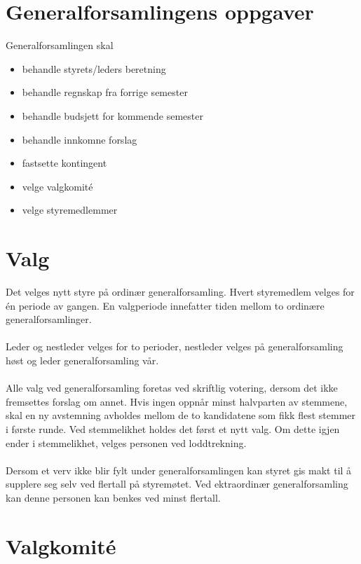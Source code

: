 \documentclass[12pt,a4paper,norsk]{article}
\begin{document}
\section{Generalforsamlingens oppgaver}

Generalforsamlingen skal

\begin{itemize}
    \item behandle styrets/leders beretning
    \item behandle regnskap fra forrige semester
    \item behandle budsjett for kommende semester
    \item behandle innkomne forslag
    \item fastsette kontingent
    \item velge valgkomité
    \item velge styremedlemmer
\end{itemize}



\section{Valg}

Det velges nytt styre på ordinær generalforsamling. Hvert styremedlem velges for én periode av gangen. En valgperiode innefatter tiden mellom to ordinære generalforsamlinger.
\\
\\
Leder og nestleder velges for to perioder, nestleder velges på generalforsamling høst og leder generalforsamling vår.
\\
\\
Alle valg ved generalforsamling foretas ved skriftlig votering, dersom det ikke fremsettes forslag om annet. Hvis ingen oppnår minst halvparten av stemmene, skal en ny avstemning avholdes mellom de to kandidatene som fikk flest stemmer i første runde. Ved stemmelikhet holdes det først et nytt valg. Om dette igjen ender i stemmelikhet, velges personen ved loddtrekning.
\\
\\
Dersom et verv ikke blir fylt under generalforsamlingen kan styret gis makt til å supplere seg selv ved  flertall på styremøtet. Ved ektraordinær generalforsamling kan denne personen kan benkes ved minst  flertall.



\section{Valgkomité}
\end{document}
